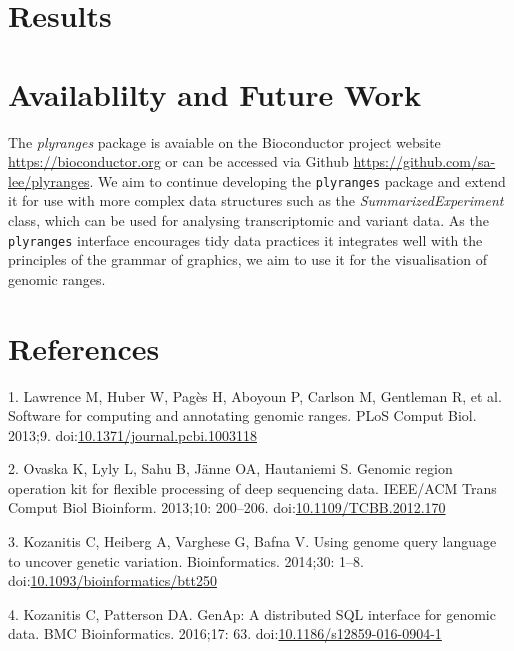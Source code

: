 \documentclass[10pt,letterpaper]{article}
\begin{document}
\hypertarget{results}{%
\section{Results}\label{results}}

\hypertarget{availablilty-and-future-work}{%
\section{Availablilty and Future
Work}\label{availablilty-and-future-work}}

The \emph{plyranges} package is avaiable on the Bioconductor project
website \url{https://bioconductor.org} or can be accessed via Github
\url{https://github.com/sa-lee/plyranges}. We aim to continue developing
the \texttt{plyranges} package and extend it for use with more complex
data structures such as the \emph{SummarizedExperiment} class, which can
be used for analysing transcriptomic and variant data. As the
\texttt{plyranges} interface encourages tidy data practices it
integrates well with the principles of the grammar of graphics, we aim
to use it for the visualisation of genomic ranges.

\hypertarget{references}{%
\section*{References}\label{references}}

\hypertarget{refs}{}
\leavevmode\hypertarget{ref-Lawrence2013-wg}{}%
1. Lawrence M, Huber W, Pagès H, Aboyoun P, Carlson M, Gentleman R, et
al. Software for computing and annotating genomic ranges. PLoS Comput
Biol. 2013;9.
doi:\href{https://doi.org/10.1371/journal.pcbi.1003118}{10.1371/journal.pcbi.1003118}

\leavevmode\hypertarget{ref-Ovaska2013-gd}{}%
2. Ovaska K, Lyly L, Sahu B, Jänne OA, Hautaniemi S. Genomic region
operation kit for flexible processing of deep sequencing data. IEEE/ACM
Trans Comput Biol Bioinform. 2013;10: 200--206.
doi:\href{https://doi.org/10.1109/TCBB.2012.170}{10.1109/TCBB.2012.170}

\leavevmode\hypertarget{ref-Kozanitis2014-va}{}%
3. Kozanitis C, Heiberg A, Varghese G, Bafna V. Using genome query
language to uncover genetic variation. Bioinformatics. 2014;30: 1--8.
doi:\href{https://doi.org/10.1093/bioinformatics/btt250}{10.1093/bioinformatics/btt250}

\leavevmode\hypertarget{ref-Kozanitis2016-bm}{}%
4. Kozanitis C, Patterson DA. GenAp: A distributed SQL interface for
genomic data. BMC Bioinformatics. 2016;17: 63.
doi:\href{https://doi.org/10.1186/s12859-016-0904-1}{10.1186/s12859-016-0904-1}
\end{document}
